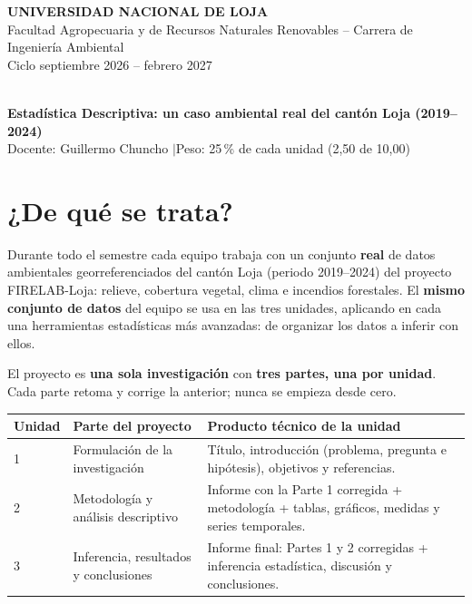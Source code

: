 \documentclass[11pt,a4paper]{article}
\begin{document}
\begin{center}
{\large\bfseries UNIVERSIDAD NACIONAL DE LOJA}\\[2pt]
{\normalsize Facultad Agropecuaria y de Recursos Naturales Renovables -- Carrera de Ingeniería Ambiental}\\[2pt]
{\small Ciclo septiembre 2026 -- febrero 2027}
\end{center}
\vspace{-0.3em}
\begin{tcolorbox}[colback=petroleo,colframe=petroleo,arc=1pt,halign=center,top=6pt,bottom=6pt]
\color{white}{\Large\bfseries GUÍA DEL PROYECTO INTEGRADOR}\\[3pt]
{\normalsize\bfseries Estadística Descriptiva: un caso ambiental real del cantón Loja (2019--2024)}\\[3pt]
{\footnotesize Docente: Guillermo Chuncho \quad$\vert$\quad Peso: 25\,\% de cada unidad (2,50 de 10,00)}
\end{tcolorbox}

\section{¿De qué se trata?}

Durante todo el semestre cada equipo trabaja con un conjunto \textbf{real} de datos ambientales georreferenciados del cantón Loja (periodo 2019--2024) del proyecto FIRELAB-Loja: relieve, cobertura vegetal, clima e incendios forestales. El \textbf{mismo conjunto de datos} del equipo se usa en las tres unidades, aplicando en cada una herramientas estadísticas más avanzadas: de organizar los datos a inferir con ellos.

El proyecto es \textbf{una sola investigación} con \textbf{tres partes, una por unidad}. Cada parte retoma y corrige la anterior; nunca se empieza desde cero.

\begin{center}
\small
\renewcommand{\arraystretch}{1.2}
\begin{tabularx}{\textwidth}{C{1.3cm}L{3.6cm}Y}
\toprule
\textbf{Unidad} & \textbf{Parte del proyecto} & \textbf{Producto técnico de la unidad} \\
 & Formulación de la investigación & Título, introducción (problema, pregunta e hipótesis), objetivos y referencias. \\
2 & Metodología y análisis descriptivo & Informe con la Parte 1 corregida + metodología + tablas, gráficos, medidas y series temporales. \\
3 & Inferencia, resultados y conclusiones & Informe final: Partes 1 y 2 corregidas + inferencia estadística, discusión y conclusiones. \\
\bottomrule
\end{tabularx}
\end{center}
\end{document}
